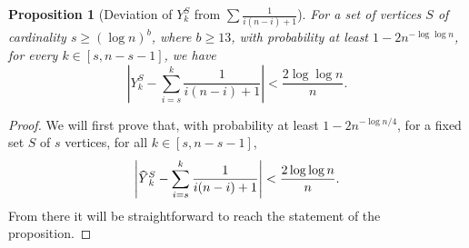 \documentclass[a4paper,11pt]{article}
\theoremstyle{definition}
\theoremstyle{plain}
\newtheorem{proposition}{Proposition}
\newcommand{\capped}[1]{\hstretch{2}{\hat{\hstretch{.5}{#1}}}}
\begin{document}
\begin{proposition}[Deviation of $Y^S_k$ from $\sum \frac{1}{i(n-i) + 1}$]\label{th:YConc}
  For a set of vertices $S$ of cardinality $ s\ge (\log n)^b$, where $b\ge 13$,
  with probability at least $1 - 2n^{-\log \log n}$,
  for every $k\in [ s, n- s-1]$, we have
  \[
  \left| Y_k^{S} - \sum_{i=s}^k \frac{1}{i(n-i) + 1} \right|
  < \frac{2\log\log n}{n}.
  \]
\end{proposition}
\begin{proof}
  We will first prove that, with probability at least $1 - 2n^{-\log n/4}$, for a fixed set $S$ of $s$ vertices, for all $k\in [ s, n- s-1]$,
  \begin{align}\label{eq: trunc}
      \left| \capped{Y}_k^{S} - \sum_{i=s}^k \frac{1}{i(n-i) + 1} \right| < \frac{2\log\log n}{n}.
  \end{align}
  From there it will be straightforward to reach the statement of the proposition.


\end{proof}
\end{document}
